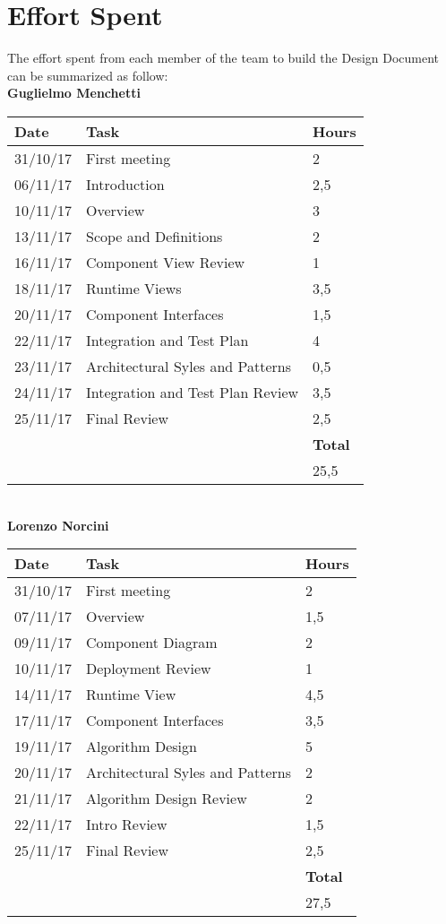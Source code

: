 \section{Effort Spent}

The effort spent from each member of the team to build the Design Document can be summarized as follow: \\

\noindent
\textbf{Guglielmo Menchetti}\\

\begin{tabular}{| l | l | l |}
	\hline
	\textbf{Date} & \textbf{Task} & \textbf{Hours}\\
	\hline
	31/10/17 & First meeting & 2\\
	06/11/17 & Introduction & 2,5\\
	10/11/17 & Overview & 3\\
	13/11/17 & Scope and Definitions & 2\\
	16/11/17 & Component View Review & 1\\
	18/11/17 & Runtime Views & 3,5\\
	20/11/17 & Component Interfaces & 1,5 \\
	22/11/17 & Integration and Test Plan & 4 \\
	23/11/17 & Architectural Syles and Patterns & 0,5\\
	24/11/17 & Integration and Test Plan Review & 3,5\\
	25/11/17 & Final Review & 2,5\\
	\hline
	& & \textbf{Total}\\
	\hline
	& & 25,5\\	
	\hline

\end{tabular}\\

\newpage
\noindent
\textbf{Lorenzo Norcini}\\

\begin{tabular}{| l | l | l |}
	\hline
	\textbf{Date} & \textbf{Task} & \textbf{Hours}\\
	\hline
	31/10/17 & First meeting & 2\\
	07/11/17 & Overview & 1,5\\
	09/11/17 & Component Diagram & 2\\
	10/11/17 & Deployment Review & 1\\
	14/11/17 & Runtime View & 4,5\\
	17/11/17 & Component Interfaces & 3,5\\
	19/11/17 & Algorithm Design & 5\\
	20/11/17 & Architectural Syles and Patterns & 2\\
	21/11/17 & Algorithm Design Review & 2\\
	22/11/17 & Intro Review & 1,5\\
	25/11/17 & Final Review & 2,5\\
	\hline
	& & \textbf{Total}\\
	\hline
	& & 27,5\\	
	\hline

\end{tabular}\\


